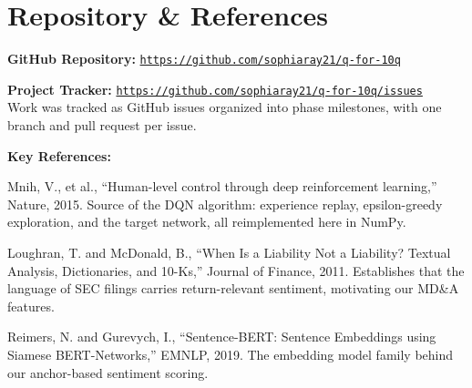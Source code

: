 \documentclass[11pt, letterpaper]{article}
\begin{document}
\section{Repository \& References}
\begin{tcolorbox}[sectionbox, height=4.7cm, valign=top]
  \textbf{GitHub Repository:}
  \href{https://github.com/sophiaray21/q-for-10q}%
       {\texttt{https://github.com/sophiaray21/q-for-10q}}\vspace{1em}

  \textbf{Project Tracker:} \href{https://github.com/sophiaray21/q-for-10q/issues}{\texttt{https://github.com/sophiaray21/q-for-10q/issues}}\\
  Work was tracked as GitHub issues organized into phase milestones, with one branch and pull request per issue.

  \vspace{6pt}
  \textbf{Key References:}
  \begin{enumerate}[leftmargin=1.4em, itemsep=1pt, topsep=2pt, label={[\arabic*]}]
    \item Mnih, V., et al., ``Human-level control through deep reinforcement learning,'' Nature, 2015. Source of the DQN algorithm: experience replay, epsilon-greedy exploration, and the target network, all reimplemented here in NumPy.
    \item Loughran, T. and McDonald, B., ``When Is a Liability Not a Liability? Textual Analysis, Dictionaries, and 10-Ks,'' Journal of Finance, 2011. Establishes that the language of SEC filings carries return-relevant sentiment, motivating our MD\&A features.
    \item Reimers, N. and Gurevych, I., ``Sentence-BERT: Sentence Embeddings using Siamese BERT-Networks,'' EMNLP, 2019. The embedding model family behind our anchor-based sentiment scoring.
  \end{enumerate}
\end{tcolorbox}
\end{document}
